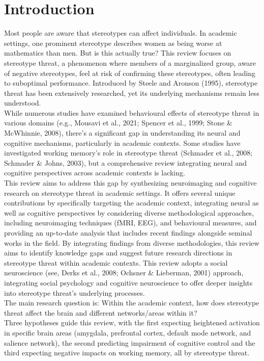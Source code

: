 \documentclass[
  stu, a4paper, 12pt,mask,floatsintext]{apa7}
\begin{document}
\newpage

\section{Introduction}\label{introduction}

Most people are aware that stereotypes can affect individuals. In academic settings, one prominent stereotype describes women as being worse at mathematics than men. But is this actually true? This review focuses on stereotype threat, a phenomenon where members of a marginalized group, aware of negative stereotypes, feel at risk of confirming these stereotypes, often leading to suboptimal performance. Introduced by Steele and Aronson (1995), stereotype threat has been extensively researched, yet its underlying mechanisms remain less understood.\\
While numerous studies have examined behavioural effects of stereotype threat in various domains (e.g., Mousavi et al., 2021; Spencer et al., 1999; Stone \& McWhinnie, 2008), there's a significant gap in understanding its neural and cognitive mechanisms, particularly in academic contexts. Some studies have investigated working memory's role in stereotype threat (Schmader et al., 2008; Schmader \& Johns, 2003), but a comprehensive review integrating neural and cognitive perspectives across academic contexts is lacking.\\
This review aims to address this gap by synthesizing neuroimaging and cognitive research on stereotype threat in academic settings.
It offers several unique contributions by specifically targeting the academic context, integrating neural as well as cognitive perspectives by considering diverse methodological approaches, including neuroimaging techniques (fMRI, EEG), and behavioural measures, and providing an up-to-date analysis that includes recent findings alongside seminal works in the field.
By integrating findings from diverse methodologies, this review aims to identify knowledge gaps and suggest future research directions in stereotype threat within academic contexts.
This review adopts a social neuroscience (see, Derks et al., 2008; Ochsner \& Lieberman, 2001) approach, integrating social psychology and cognitive neuroscience to offer deeper insights into stereotype threat's underlying processes.\\
The main research question is: Within the academic context, how does stereotype threat affect the brain and different networks/areas within it?\\
Three hypotheses guide this review, with the first expecting heightened activation in specific brain areas (amygdala, prefrontal cortex, default mode network, and salience network), the second predicting impairment of cognitive control and the third expecting negative impacts on working memory, all by stereotype threat.\\
\end{document}
